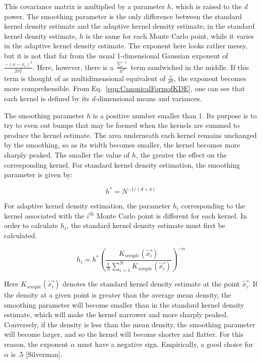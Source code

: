 \documentclass[prd,twocolumn]{revtex4}
\begin{document}
  This covariance matrix is multiplied by a parameter $h$, which is raised to the $d$ power.  The smoothing parameter is the only difference between the standard kernel density estimate and the adaptive kernel density estimate; in the standard kernel density estimate, $h$ is the same for each Monte Carlo point, while it varies in the adaptive kernel density estimate.  The exponent here looks rather messy, but it is not that far from the usual 1-dimensional Gaussian exponent of $\frac{-(x-x_i)^2}{2\sigma_x^2}$.  Here, however, there is a $\frac{{\sum}^{-1}} {h^d}$ term sandwiched in the middle.  If this term is thought of as multidimensional equivalent of $\frac {1}{\sigma^2}$, the exponent becomes more comprehensible.  From Eq.~\ref{eqn:CanonicalFormofKDE}, one can see that each kernel is defined by its $d$-dimensional means and variances. 

The smoothing parameter $h$ is a positive number smaller than 1.  Its purpose is to try to even out bumps that may be formed when the kernels are summed to produce the kernel estimate.  The area underneath each kernel remains unchanged by the smoothing, so as its width becomes smaller, the kernel becomes more sharply peaked.  The smaller the value of $h$, the greater the effect on the corresponding kernel.  For standard kernel density estimation, the smoothing parameter is given by:

\begin{equation}
h^* = N^{-1/(d+4)}
\end{equation}

For adaptive kernel density estimation, the parameter $h_i$ corresponding to the kernel associated with the $i^{\text{th}}$ Monte Carlo point is different for each kernel.  In order to calculate $h_i$, the standard kernel density estimate must first be calculated.

\begin{equation}
h_i = h^* (\frac {K_{simple}(\vec{x_i})} {\frac {1}{N} \sum_{i=1}^N {K_{simple}(\vec{x_i})}})^{-\alpha}
\end{equation}

Here $K_{simple}(\vec{x_i})$ denotes the standard kernel density estimate at the point $\vec{x_i}$.  If the density at a given point is greater than the average mean density, the smoothing parameter will become smaller than in the standard kernel density estimate, which will make the kernel narrower and more sharply peaked.  Conversely, if the density is less than the mean density, the smoothing parameter will become larger, and so the kernel will become shorter and flatter.  For this reason, the exponent $\alpha$ must have a negative sign.  Empirically, a good choice for $\alpha$ is .5 [Silverman].  
\end{document}
